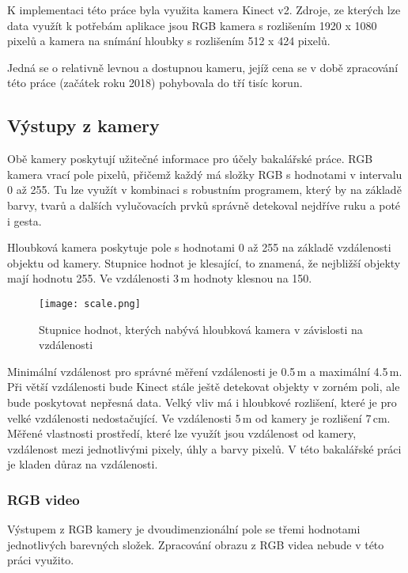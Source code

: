 K implementaci této práce byla využita kamera Kinect v2. Zdroje, ze kterých lze data využít k potřebám aplikace jsou RGB kamera s rozlišením 1920 x 1080 pixelů a kamera na snímání hloubky s rozlišením 512 x 424 pixelů.

Jedná se o relativně levnou a dostupnou kameru, jejíž cena se v době zpracování této práce (začátek roku 2018) pohybovala do tří tisíc korun.

\subsection{Výstupy z kamery}

Obě kamery poskytují užitečné informace pro účely bakalářské práce. RGB kamera vrací pole pixelů, přičemž každý má složky RGB s hodnotami v intervalu 0 až 255. Tu lze využít v kombinaci s robustním programem, který by na základě barvy, tvarů a dalších vylučovacích prvků správně detekoval nejdříve ruku a poté i gesta. %

Hloubková kamera poskytuje pole s hodnotami 0 až 255 na základě vzdálenosti objektu od kamery. Stupnice hodnot je klesající, to znamená, že nejbližší objekty mají hodnotu 255. Ve vzdálenosti 3\,m hodnoty klesnou na 150. 

\begin{figure}[htp]
\centering
\texttt{[image: scale.png]}
\caption{Stupnice hodnot, kterých nabývá hloubková kamera v závislosti na vzdálenosti}
\label{fig:scale}
\label{pic9}
\end{figure}

Minimální vzdálenost pro správné měření vzdálenosti je 0.5\,m a maximální 4.5\,m. Při větší vzdálenosti bude Kinect stále ještě detekovat objekty v zorném poli, ale bude poskytovat nepřesná data. Velký vliv má i hloubkové rozlišení, které je pro velké vzdálenosti nedostačující. Ve vzdálenosti 5\,m od kamery je rozlišení 7\,cm.\\

Měřené vlastnosti prostředí, které lze využít jsou vzdálenost od kamery, vzdálenost mezi jednotlivými pixely, úhly a barvy pixelů. V této bakalářské práci je kladen důraz na vzdálenosti.

\subsubsection{RGB video}
Výstupem z RGB kamery je dvoudimenzionální pole se třemi hodnotami jednotlivých barevných složek. Zpracování obrazu z RGB videa nebude v této práci využito. \\

